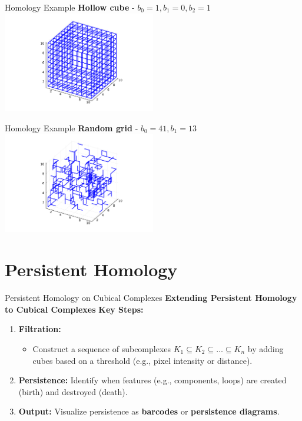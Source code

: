 \documentclass[aspectratio=169,xcolor=dvipsnames]{beamer}
\begin{document}
\begin{frame}{Homology Example}
    \textbf{Hollow cube} - $b_0 = 1, b_1 = 0, b_2 = 1$
    \vspace{1em}
    \centering
    \includegraphics[width=0.5\textwidth]{hollow_cube.png}
\end{frame}

\begin{frame}{Homology Example}
    \textbf{Random grid} - $b_0 = 41, b_1 = 13$
    \vspace{1em}
    \centering
    \includegraphics[width=0.5\textwidth]{random_grid.png}
\end{frame}


\section{Persistent Homology}


\begin{frame}{Persistent Homology on Cubical Complexes}
    \textbf{Extending Persistent Homology to Cubical Complexes}
    \textbf{Key Steps:}
    \begin{enumerate}
        \item \textbf{Filtration:} 
        \begin{itemize}
            \item Construct a sequence of subcomplexes \(K_1 \subseteq K_2 \subseteq \dots \subseteq K_n\) by adding cubes based on a threshold (e.g., pixel intensity or distance).
        \end{itemize}
        \item \textbf{Persistence:} Identify when features (e.g., components, loops) are created (birth) and destroyed (death).
        \item \textbf{Output:} Visualize persistence as \textbf{barcodes} or \textbf{persistence diagrams}.
    \end{enumerate}

\end{frame}
\end{document}
